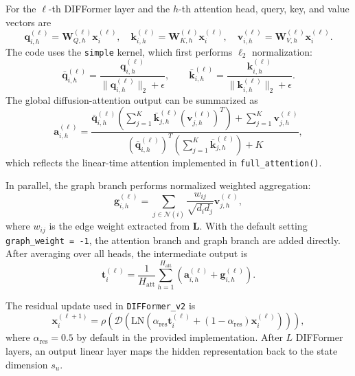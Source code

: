 \documentclass[conference]{IEEEtran}
\begin{document}
For the $\ell$-th DIFFormer layer and the $h$-th attention head, query, key, and value vectors are
\begin{equation}
\mathbf{q}_{i,h}^{(\ell)} = \mathbf{W}_{Q,h}^{(\ell)}\mathbf{x}_i^{(\ell)},
\quad
\mathbf{k}_{i,h}^{(\ell)} = \mathbf{W}_{K,h}^{(\ell)}\mathbf{x}_i^{(\ell)},
\quad
\mathbf{v}_{i,h}^{(\ell)} = \mathbf{W}_{V,h}^{(\ell)}\mathbf{x}_i^{(\ell)}.
\label{eq:qkv}
\end{equation}
The code uses the \texttt{simple} kernel, which first performs $\ell_2$ normalization:
\begin{equation}
\bar{\mathbf{q}}_{i,h}^{(\ell)}
=
\frac{\mathbf{q}_{i,h}^{(\ell)}}
{\|\mathbf{q}_{i,h}^{(\ell)}\|_2+\epsilon},
\qquad
\bar{\mathbf{k}}_{i,h}^{(\ell)}
=
\frac{\mathbf{k}_{i,h}^{(\ell)}}
{\|\mathbf{k}_{i,h}^{(\ell)}\|_2+\epsilon}.
\label{eq:norm_qk}
\end{equation}
The global diffusion-attention output can be summarized as
\begin{equation}
\mathbf{a}_{i,h}^{(\ell)}
=
\frac{
\bar{\mathbf{q}}_{i,h}^{(\ell)}
\left(
\sum_{j=1}^{K}
\bar{\mathbf{k}}_{j,h}^{(\ell)}
(\mathbf{v}_{j,h}^{(\ell)})^T
\right)
+
\sum_{j=1}^{K}\mathbf{v}_{j,h}^{(\ell)}
}{
(\bar{\mathbf{q}}_{i,h}^{(\ell)})^T
\left(
\sum_{j=1}^{K}\bar{\mathbf{k}}_{j,h}^{(\ell)}
\right)
+ K
},
\label{eq:linear_attention}
\end{equation}
which reflects the linear-time attention implemented in \texttt{full\_attention()}.

In parallel, the graph branch performs normalized weighted aggregation:
\begin{equation}
\mathbf{g}_{i,h}^{(\ell)}
=
\sum_{j\in\mathcal{N}(i)}
\frac{w_{ij}}{\sqrt{d_i d_j}}
\mathbf{v}_{j,h}^{(\ell)},
\label{eq:gcn_branch}
\end{equation}
where $w_{ij}$ is the edge weight extracted from $\mathbf{L}$. With the default setting \texttt{graph\_weight = -1}, the attention branch and graph branch are added directly. After averaging over all heads, the intermediate output is
\begin{equation}
\mathbf{t}_i^{(\ell)}
=
\frac{1}{H_{\mathrm{att}}}
\sum_{h=1}^{H_{\mathrm{att}}}
\left(
\mathbf{a}_{i,h}^{(\ell)} + \mathbf{g}_{i,h}^{(\ell)}
\right).
\label{eq:transconv_out}
\end{equation}

The residual update used in \texttt{DIFFormer\_v2} is
\begin{equation}
\mathbf{x}_i^{(\ell+1)}
=
\rho
\left(
\mathcal{D}
\left(
\mathrm{LN}
\left(
\alpha_{\mathrm{res}}\mathbf{t}_i^{(\ell)}
+
(1-\alpha_{\mathrm{res}})\mathbf{x}_i^{(\ell)}
\right)
\right)
\right),
\label{eq:residual_update}
\end{equation}
where $\alpha_{\mathrm{res}}=0.5$ by default in the provided implementation. After $L$ DIFFormer layers, an output linear layer maps the hidden representation back to the state dimension $s_u$.
\end{document}
